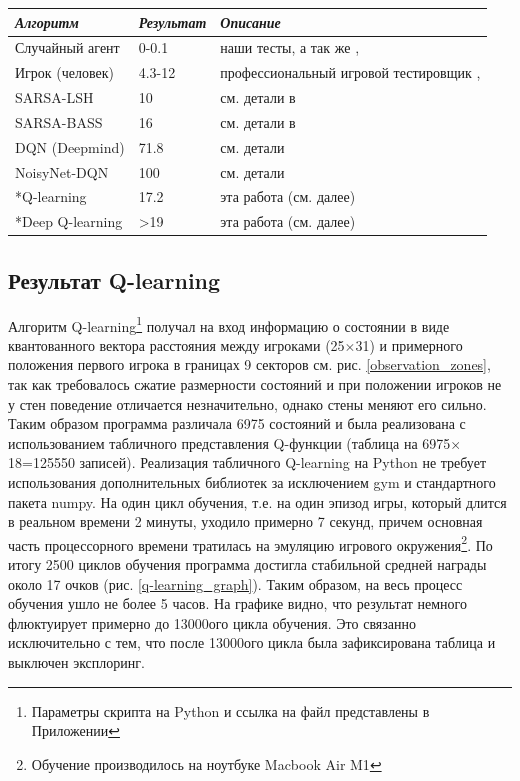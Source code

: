 \documentclass{letask}
\begin{document}
\begin{center}
    \begin{tabular}{| l | l | p{7cm} |}
    \hline
    \textbf{\textit{Алгоритм}} & \textbf{\textit{Результат}} & \textbf{\textit{Описание}} \\ \hline
    Случайный агент & 0-0.1 & наши тесты, а так же \cite{Mnih}, \cite{Fortunato}  \\ \hline
    Игрок (человек) & 4.3-12 & профессиональный игровой тестировщик \cite{Mnih}, \cite{Fortunato}  \\ \hline
    SARSA-LSH & 10 & см. детали в \cite{Bellemare}\\ \hline
    SARSA-BASS & 16 & см. детали в \cite{Bellemare} \\ \hline
    DQN (Deepmind) & 71.8 & см. детали \cite{Mnih} \\ \hline
    NoisyNet-DQN & 100 & см. детали \cite{Fortunato}  \\ \hline
    *Q-learning & 17.2 & эта работа (см. далее) \\ \hline
    *Deep Q-learning & >19 & эта работа (см. далее) \\ \hline
    \end{tabular}
\end{center}


\subsection{Результат Q-learning}
Алгоритм Q-learning\footnote{Параметры скрипта на Python и ссылка на файл представлены в Приложении} получал на вход информацию о состоянии в виде квантованного вектора расстояния между игроками (25$\times$31) и примерного положения первого игрока в границах 9 секторов см. рис. \ref{observation_zones}, так как требовалось сжатие размерности состояний и при положении игроков не у стен поведение отличается незначительно, однако стены меняют его сильно. Таким образом программа различала 6975 состояний и была реализована с использованием табличного представления Q-функции (таблица на 6975$\times$18=125550 записей). Реализация табличного Q-learning на Python не требует использования дополнительных библиотек за исключением gym и стандартного пакета numpy. На один цикл обучения, т.е. на один эпизод игры, который длится в реальном времени 2 минуты, уходило примерно 7 секунд, причем основная часть процессорного времени тратилась на эмуляцию игрового окружения\footnote{Обучение производилось на ноутбуке Macbook Air M1}. По итогу 2500 циклов обучения программа достигла стабильной средней награды около 17 очков (рис. \ref{q-learning_graph}). Таким образом, на весь процесс обучения ушло не более 5 часов. На графике видно, что результат немного флюктуирует примерно до 13000ого цикла обучения. Это связанно исключительно с тем, что после 13000ого цикла была зафиксирована таблица и выключен эксплоринг.
\end{document}
